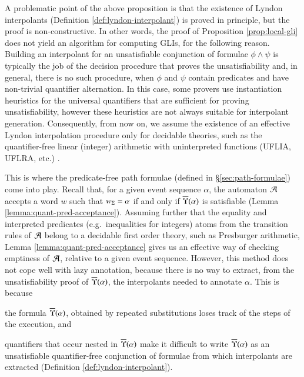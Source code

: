 A problematic point of the above proposition is that the existence of
Lyndon interpolants (Definition \ref{def:lyndon-interpolant}) is
proved in principle, but the proof is non-constructive. In other
words, the proof of Proposition \ref{prop:local-gli} does not yield an
algorithm for computing GLIs, for the following reason. Building an
interpolant for an unsatisfiable conjunction of formulae $\phi \wedge
\psi$ is typically the job of the decision procedure that proves the
unsatisfiability and, in general, there is no such procedure, when
$\phi$ and $\psi$ contain predicates and have non-trivial quantifier
alternation. In this case, some provers use instantiation heuristics
for the universal quantifiers that are sufficient for proving
unsatisfiability, however these heuristics are not always suitable for
interpolant generation. Consequently, from now on, we assume the
existence of an effective Lyndon interpolation procedure only for
decidable theories, such as the quantifier-free linear (integer)
arithmetic with uninterpreted functions (UFLIA, UFLRA, etc.)
\cite{RybalchenkoSofronieStokkermans}.

This is where the predicate-free path formulae (defined in
\S\ref{sec:path-formulae}) come into play. Recall that, for a given
event sequence $\alpha$, the automaton $\mathcal{A}$ accepts a word $w$ such
that ${w}_\Sigma = \alpha$ if and only if $\overline{\Upsilon}({\alpha})$ is
satisfiable (Lemma \ref{lemma:quant-pred-acceptance}). Assuming
further that the equality and interpreted predicates
(e.g.\ inequalities for integers) atoms from the transition rules of
$\mathcal{A}$ belong to a decidable first order theory, such as Presburger
arithmetic, Lemma \ref{lemma:quant-pred-acceptance} gives us an
effective way of checking emptiness of $\mathcal{A}$, relative to a given event
sequence. However, this method does not cope well with lazy
annotation, because there is no way to extract, from the
unsatisfiability proof of $\overline{\Upsilon}({\alpha})$, the interpolants
needed to annotate $\alpha$. This is because \begin{inparaenum}[(I)]
\item\label{it1:gli} the formula $\overline{\Upsilon}({\alpha})$, obtained by
  repeated substitutions loses track of the steps of the execution,
  and
%
\item\label{it2:gli} quantifiers that occur nested in
  $\overline{\Upsilon}({\alpha})$ make it difficult to write $\overline{\Upsilon}({\alpha})$
  as an unsatisfiable quantifier-free conjunction of formulae from
  which interpolants are extracted (Definition
  \ref{def:lyndon-interpolant}).
\end{inparaenum}


